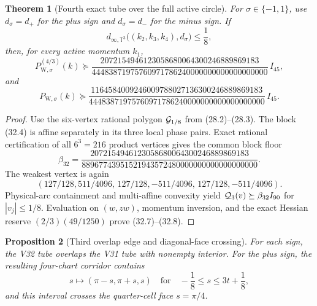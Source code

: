 \documentclass[11pt,oneside]{article}
\newtheorem{theorem}{Theorem}[section]
\newtheorem{proposition}[theorem]{Proposition}
\theoremstyle{definition}
\theoremstyle{remark}
\begin{document}
\begin{theorem}[Fourth exact tube over the full active circle]
\label{thm:newv32-fourth-tube}
For \(\sigma\in\{-1,1\}\), use \(d_\sigma=d_+\) for the plus
sign and \(d_\sigma=d_-\) for the minus sign.  If
\[
 d_{\infty,\mathbb T^3}
 \bigl((k_2,k_3,k_4),d_\sigma\bigr)\le\frac18,          \tag{32.6}
\]
then, for every active momentum \(k_1\),
\[
 P_{\mathrm W,\sigma}^{(4/3)}(k)\succeq
 \frac{2072154946123058680064300246889869183}
 {44483871975760971786240000000000000000000}\,I_{45},  \tag{32.7}
\]
and
\[
 P_{\mathrm W,\sigma}(k)\succeq
 \frac{1164584009246009788027136300246889869183}
 {44483871975760971786240000000000000000000}\,I_{45}.  \tag{32.8}
\]
\end{theorem}

\begin{proof}
Use the six-vertex rational polygon
\({\cal G}_{1/8}\) from (28.2)--(28.3).  The block (32.4) is affine
separately in its three local phase pairs.  Exact rational
certification of all \(6^3=216\) product vertices gives the common
block floor
\[
 \beta_{32}=
 \frac{2072154946123058680064300246889869183}
 {88967743951521943572480000000000000000000}.           \tag{32.9}
\]
The weakest vertex is again
\[
 (127/128,511/4096,\,
  127/128,-511/4096,\,
  127/128,-511/4096).                                  \tag{32.10}
\]
Physical-arc containment and multi-affine convexity yield
\({\cal Q}_3(v)\succeq\beta_{32}I_{90}\) for
\(|v_j|\le1/8\).  Evaluation on \((w,zw)\), momentum inversion, and
the exact Hessian reserve \((2/3)(49/1250)\) prove
(32.7)--(32.8).
\end{proof}

\begin{proposition}[Third overlap edge and diagonal-face crossing]
\label{prop:newv32-crossing}
For each sign, the V32 tube overlaps the V31 tube with nonempty
interior.  For the plus sign, the resulting four-chart corridor
contains
\[
 s\longmapsto(\pi-s,\pi+s,s)
 \quad\text{for}\quad
 -\frac18\le s\le3t+\frac18,                            \tag{32.11}
\]
and this interval crosses the quarter-cell face \(s=\pi/4\).
\end{proposition}
\end{document}
